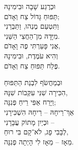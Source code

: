 \documentclass[]{article}
\begin{document}
\begin{multicols}{3}
\begin{displayquote}
			וּכְרֶגַע שָׁבָה וּבִימִינָהּ \\
			תַּפּוּחַ גָּדוֹל צַח וְאָדֹם; \\
			וַתִּטְעַם מֶנְהוּ, וַתַּבְרֵנִי \\
			מִיָּדָהּ מִן־הַחֲצִי הַשֵּׁנִי. \\
			אֲנִי פָּעַרְתִּי פֶה וָאָדֹם, \\
			וְהִיא עֹמֶדֶת, וּבִימִינָהּ \\
			פֶּלַח תַּפּוּחַ צַח וְאָדֹם. 
			
			וּבְמַחֲשֹׂף לִבְנַת הַתַּפּוּחַ \\
			הִכִּירָה שִׁנִּי עִקְּבוֹת שִׁנָּהּ, \\
			וַיָּרַח אַפִּי רֵיחַ פְּנִנָּה; \\ 
			אַךְ־רֵיחָהּ – רֵיחָהּ הִשְׁכִּירָנִי \\
			וּכְיַיִן מָתוֹק עֲבָרָנִי – \\
			לְבָבִי פָג, לֹא־קָם בִּי רוּחַ, \\
			מֵאָז – מֵאָז לִי הָיְתָה פְנִנָּה. 
			
		\end{displayquote}
	\end{multicols}
	
\end{document}
